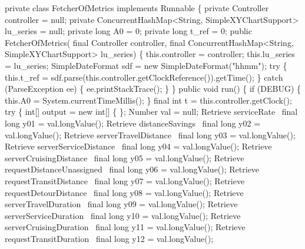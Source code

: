 \nwenddocs{}\plusendmoddef
private class FetcherOfMetrics implements Runnable \{
  private Controller controller = null;
  private ConcurrentHashMap<String, SimpleXYChartSupport> lu_series = null;
  private long A0 = 0;
  private long t_ref = 0;
  public FetcherOfMetrics(
      final Controller controller,
      final ConcurrentHashMap<String, SimpleXYChartSupport> lu_series) \{
    this.controller = controller;
    this.lu_series = lu_series;
    SimpleDateFormat sdf = new SimpleDateFormat("hhmm");
    try \{
      this.t_ref = sdf.parse(this.controller.getClockReference()).getTime();
    \} catch (ParseException ee) \{
      ee.printStackTrace();
    \}
  \}
  public void run() \{
    if (DEBUG) \{
      this.A0 = System.currentTimeMillis();
    \}
    final int t = this.controller.getClock();
    try \{
      int[] output = new int[] \{ \};
      Number val = null;
      \LA{}Retrieve serviceRate~{\nwtagstyle{}}\RA{}               final long y01 = val.longValue();
      \LA{}Retrieve distanceSavings~{\nwtagstyle{}}\RA{}           final long y02 = val.longValue();
      \LA{}Retrieve serverTravelDistance~{\nwtagstyle{}}\RA{}      final long y03 = val.longValue();
      \LA{}Retrieve serverServiceDistance~{\nwtagstyle{}}\RA{}     final long y04 = val.longValue();
      \LA{}Retrieve serverCruisingDistance~{\nwtagstyle{}}\RA{}    final long y05 = val.longValue();
      \LA{}Retrieve requestDistanceUnassigned~{\nwtagstyle{}}\RA{} final long y06 = val.longValue();
      \LA{}Retrieve requestTransitDistance~{\nwtagstyle{}}\RA{}    final long y07 = val.longValue();
      \LA{}Retrieve requestDetourDistance~{\nwtagstyle{}}\RA{}     final long y08 = val.longValue();
      \LA{}Retrieve serverTravelDuration~{\nwtagstyle{}}\RA{}      final long y09 = val.longValue();
      \LA{}Retrieve serverServiceDuration~{\nwtagstyle{}}\RA{}     final long y10 = val.longValue();
      \LA{}Retrieve serverCruisingDuration~{\nwtagstyle{}}\RA{}    final long y11 = val.longValue();
      \LA{}Retrieve requestTransitDuration~{\nwtagstyle{}}\RA{}    final long y12 = val.longValue();
